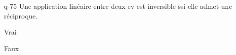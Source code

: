 \begin{truefalse}{q-75}
Une application linéaire entre deux ev est inversible ssi elle admet une réciproque.
\item* Vrai
\item Faux
\end{truefalse}

